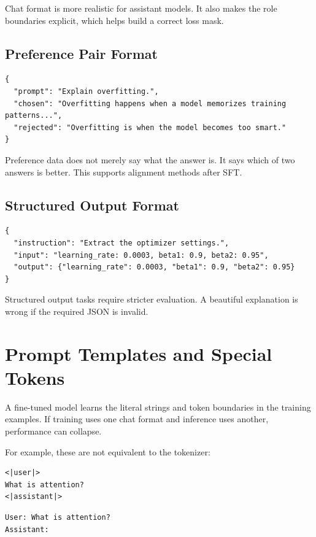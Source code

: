 Chat format is more realistic for assistant models. It also makes the role boundaries explicit, which helps build a correct loss mask.

\subsection*{Preference Pair Format}

\begin{lstlisting}
{
  "prompt": "Explain overfitting.",
  "chosen": "Overfitting happens when a model memorizes training patterns...",
  "rejected": "Overfitting is when the model becomes too smart."
}
\end{lstlisting}

Preference data does not merely say what the answer is. It says which of two answers is better. This supports alignment methods after SFT.

\subsection*{Structured Output Format}

\begin{lstlisting}
{
  "instruction": "Extract the optimizer settings.",
  "input": "learning_rate: 0.0003, beta1: 0.9, beta2: 0.95",
  "output": {"learning_rate": 0.0003, "beta1": 0.9, "beta2": 0.95}
}
\end{lstlisting}

Structured output tasks require stricter evaluation. A beautiful explanation is wrong if the required JSON is invalid.

\section{Prompt Templates and Special Tokens}

A fine-tuned model learns the literal strings and token boundaries in the training examples. If training uses one chat format and inference uses another, performance can collapse.

For example, these are not equivalent to the tokenizer:

\begin{lstlisting}
<|user|>
What is attention?
<|assistant|>
\end{lstlisting}

\begin{lstlisting}
User: What is attention?
Assistant:
\end{lstlisting}

